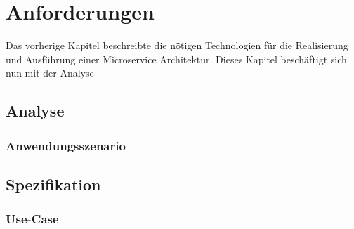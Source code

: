\chapter{Anforderungen}

Das vorherige Kapitel beschreibte die nötigen Technologien für die Realisierung und Ausführung einer Microservice Architektur.
Dieses Kapitel beschäftigt sich nun mit der Analyse 

\section{Analyse}
\subsection{Anwendungsszenario}
\section{Spezifikation}
\subsection{Use-Case}